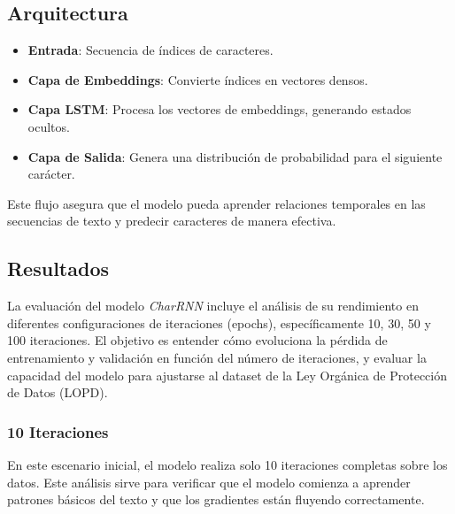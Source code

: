 \documentclass{article}
\begin{document}
\subsection{Arquitectura}
\begin{itemize}
    \item \textbf{Entrada}: Secuencia de índices de caracteres.
    \item \textbf{Capa de Embeddings}: Convierte índices en vectores densos.
    \item \textbf{Capa LSTM}: Procesa los vectores de embeddings, generando estados ocultos.
    \item \textbf{Capa de Salida}: Genera una distribución de probabilidad para el siguiente carácter.
\end{itemize}

Este flujo asegura que el modelo pueda aprender relaciones temporales en las secuencias de texto y predecir caracteres de manera efectiva.

\newpage

\subsection{Resultados}
La evaluación del modelo \textit{CharRNN} incluye el análisis de su rendimiento en diferentes configuraciones de iteraciones (epochs), específicamente 10, 30, 50 y 100 iteraciones. El objetivo es entender cómo evoluciona la pérdida de entrenamiento y validación en función del número de iteraciones, y evaluar la capacidad del modelo para ajustarse al dataset de la Ley Orgánica de Protección de Datos (LOPD).

\subsubsection{10 Iteraciones}
En este escenario inicial, el modelo realiza solo 10 iteraciones completas sobre los datos. Este análisis sirve para verificar que el modelo comienza a aprender patrones básicos del texto y que los gradientes están fluyendo correctamente. \\
\end{document}
